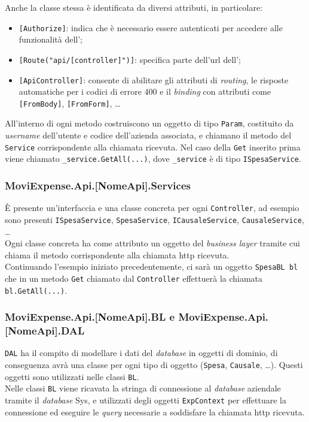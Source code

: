 \noindent Anche la classe stessa è identificata da diversi attributi, in particolare:
\begin{itemize}
    \item \texttt{[Authorize]}: indica che è necessario essere autenticati per accedere alle funzionalità dell';
    \item \texttt{[Route("api/[controller]")]}: specifica parte dell'url dell';
    \item \texttt{[ApiController]}: consente di abilitare gli attributi di \textit{routing}, le risposte automatiche per i codici di errore 400 e il \textit{binding} con attributi come \texttt{[FromBody]}, \texttt{[FromForm]}, \dots
\end{itemize}

\noindent All'interno di ogni metodo costruiscono un oggetto di tipo \texttt{Param}, costituito da \textit{username} dell'utente e codice dell'azienda associata, e chiamano il metodo del \texttt{Service} corrispondente alla chiamata ricevuta. Nel caso della \texttt{Get} inserito prima viene
chiamato \texttt{\_service.GetAll(...)}, dove \texttt{\_service} è di tipo \texttt{ISpesaService}.

\subsubsection{MoviExpense.Api.[NomeApi].Services}
\label{cap:services}

È presente un'interfaccia e una classe concreta per ogni \texttt{Controller}, ad esempio sono presenti \texttt{ISpesaService}, \texttt{SpesaService}, \texttt{ICausaleService}, \texttt{CausaleService}, \dots\\
Ogni classe concreta ha come attributo un oggetto del \textit{business layer} tramite cui chiama il metodo corrispondente alla chiamata http ricevuta.\\
Continuando l'esempio iniziato precedentemente, ci sarà un oggetto \texttt{SpesaBL bl} che in un metodo \texttt{Get} chiamato dal \texttt{Controller} effettuerà la chiamata \texttt{bl.GetAll(...)}.

\subsubsection{MoviExpense.Api.[NomeApi].BL e MoviExpense.Api.[NomeApi].DAL}

\texttt{DAL} ha il compito di modellare i dati del \textit{database} in oggetti di dominio, di conseguenza avrà una classe per ogni tipo di oggetto (\texttt{Spesa}, \texttt{Causale}, \dots). Questi oggetti sono utilizzati nelle classi \texttt{BL}.\\
Nelle classi \texttt{BL} viene ricavata la stringa di connessione al \textit{database} aziendale tramite il \textit{database} Sys, e utilizzati degli oggetti \texttt{ExpContext} per effettuare la connessione ed eseguire le \textit{query} necessarie a soddisfare la chiamata http ricevuta.

